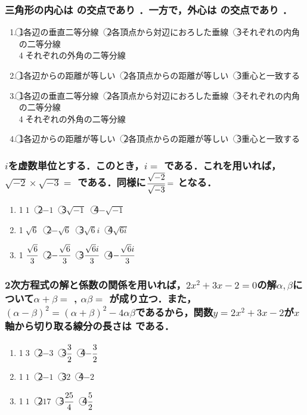 \documentclass[onecolumn,10pt]{jarticle}
\newcommand{\ctext}[1]{\textcircled{\scriptsize #1}}
\begin{document}
\subsubsection{三角形の内心は  の交点であり  ．一方で，外心は  の交点であり  ．}
\begin{enumerate}[(1)]
    \item \ctext{1}各辺の垂直二等分線　\ctext{2}各頂点から対辺におろした垂線　\ctext{3}それぞれの内角の二等分線\\\ctext{4}それぞれの外角の二等分線
    \item \ctext{1}各辺からの距離が等しい　\ctext{2}各頂点からの距離が等しい　\ctext{3}重心と一致する
    \item \ctext{1}各辺の垂直二等分線　\ctext{2}各頂点から対辺におろした垂線　\ctext{3}それぞれの内角の二等分線\\\ctext{4}それぞれの外角の二等分線
    \item \ctext{1}各辺からの距離が等しい　\ctext{2}各頂点からの距離が等しい　\ctext{3}重心と一致する
\end{enumerate}

\subsubsection{$i$を虚数単位とする．このとき，$i=$  である．これを用いれば，$\sqrt{-2}\times\sqrt{-3}=$  である．同様に$\cfrac{\sqrt{-2}}{\sqrt{-3}}=$  となる．}
\begin{enumerate}[(1)]
    \item \ctext{1}$1$　\ctext{2}$-1$　\ctext{3}$\sqrt{-1}$　\ctext{4}$-\sqrt{-1}$
    \item \ctext{1}$\sqrt{6}$　\ctext{2}$-\sqrt{6}$　\ctext{3}$\sqrt{6}i$　\ctext{4}$\sqrt{6i}$
    \item \ctext{1}$\cfrac{\sqrt{6}}{3}$　\ctext{2}$-\cfrac{\sqrt{6}}{3}$　\ctext{3}$\cfrac{\sqrt{6}i}{3}$　\ctext{4}$-\cfrac{\sqrt{6}i}{3}$
\end{enumerate}

\subsubsection{2次方程式の解と係数の関係を用いれば，$2x^2+3x-2=0$の解$\alpha,\beta$について$\alpha+\beta=$  , $\alpha\beta=$  が成り立つ．また，$(\alpha-\beta)^2=(\alpha+\beta)^2-4\alpha\beta$であるから，関数$y=2x^2+3x-2$が$x$軸から切り取る線分の長さは  である．}
\begin{enumerate}[(1)]
    \item \ctext{1}$3$　\ctext{2}$-3$　\ctext{3}$\cfrac{3}{2}$　\ctext{4}$-\cfrac{3}{2}$
    \item \ctext{1}$1$　\ctext{2}$-1$　\ctext{3}$2$　\ctext{4}$-2$
    \item \ctext{1}$1$　\ctext{2}$17$　\ctext{3}$\cfrac{25}{4}$　\ctext{4}$\cfrac{5}{2}$
\end{enumerate}
\end{document}
